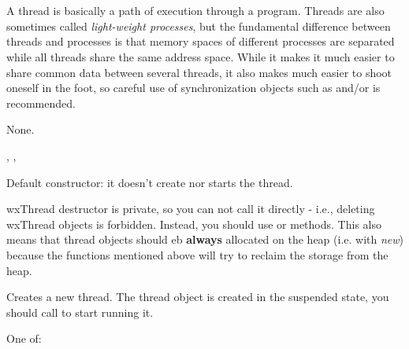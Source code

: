 \section{}\label{wxthread}

A thread is basically a path of execution through a program. Threads are also
sometimes called {\it light-weight processes}, but the fundamental difference
between threads and processes is that memory spaces of different processes are
separated while all threads share the same address space. While it makes it
much easier to share common data between several threads, it also makes much
easier to shoot oneself in the foot, so careful use of synchronization objects
such as  and/or  is recommended.


None.


, , 


\label{wxthreadctor}


Default constructor: it doesn't create nor starts the thread.



wxThread destructor is private, so you can not call it directly - i.e., deleting
wxThread objects is forbidden. Instead, you should use  or
 methods. This also means that thread objects should
eb {\bf always} allocated on the heap (i.e. with {\it new}) because the functions
mentioned above will try to reclaim the storage from the heap.

\label{wxthreadcreate}


Creates a new thread. The thread object is created in the suspended state, you
should call  to start running it.


One of:

